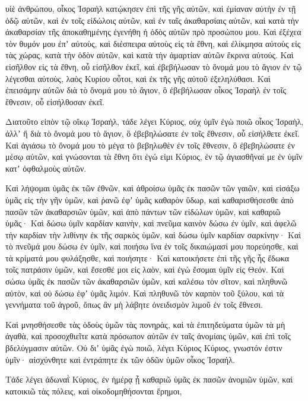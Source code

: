 {υἱὲ ἀνθρώπου, οἶκος Ἰσραὴλ κατῴκησεν ἐπὶ τῆς γῆς αὐτῶν, καὶ ἐμίαναν αὐτὴν ἐν τῇ ὁδῷ αὐτῶν, καὶ ἐν τοῖς εἰδώλοις αὐτῶν, καὶ ἐν ταῖς ἀκαθαρσίαις αὐτῶν, καὶ κατὰ τὴν ἀκαθαρσίαν τῆς ἀποκαθημένης ἐγενήθη ἡ ὁδὸς αὐτῶν πρὸ προσώπου μου.
Καὶ ἐξέχεα τὸν θυμόν μου ἐπʼ αὐτοὺς,
καὶ διέσπειρα αὐτοὺς εἰς τὰ ἔθνη, καὶ ἐλίκμησα αὐτοὺς εἰς τὰς χώρας, κατὰ τὴν ὁδὸν αὐτῶν, καὶ κατὰ τὴν ἁμαρτίαν αὐτῶν ἔκρινα αὐτούς.
Καὶ εἰσῆλθον εἰς τὰ ἔθνη, οὗ εἰσῆλθον ἐκεῖ, καὶ ἐβεβήλωσαν τὸ ὄνομά μου τὸ ἅγιον ἐν τῷ λέγεσθαι αὐτοὺς, λαὸς Κυρίου οὗτοι, καὶ ἐκ τῆς γῆς αὐτοῦ ἐξεληλύθασι.
Καὶ ἐπεισάμην αὐτῶν διὰ τὸ ὄνομά μου τὸ ἅγιον, ὃ ἐβεβήλωσαν οἶκος Ἰσραὴλ ἐν τοῖς ἔθνεσιν, οὗ εἰσήλθοσαν ἐκεῖ.
\par }{\PP {}Διατοῦτο εἰπὸν τῷ οἴκῳ Ἰσραὴλ, τάδε λέγει Κύριος, οὐχ ὑμῖν ἐγὼ ποιῶ οἶκος Ἰσραὴλ, ἀλλʼ ἢ διὰ τὸ ὄνομά μου τὸ ἅγιον, ὃ ἐβεβηλώσατε ἐν τοῖς ἔθνεσιν, οὗ εἰσήλθετε ἐκεῖ.
Καὶ ἁγιάσω τὸ ὄνομά μου τὸ μέγα τὸ βεβηλωθὲν ἐν τοῖς ἔθνεσιν, ὃ ἐβεβηλώσατε ἐν μέσῳ αὐτῶν, καὶ γνώσονται τὰ ἔθνη ὅτι ἐγώ εἰμι Κύριος, ἐν τῷ ἁγιασθῆναί με ἐν ὑμῖν κατʼ ὀφθαλμοὺς αὐτῶν.
\par }{\PP {}Καὶ λήψομαι ὑμᾶς ἐκ τῶν ἐθνῶν, καὶ ἀθροίσω ὑμᾶς ἐκ πασῶν τῶν γαιῶν, καὶ εἰσάξω ὑμᾶς εἰς τὴν γῆν ὑμῶν,
καὶ ῥανῶ ἐφʼ ὑμᾶς καθαρὸν ὕδωρ, καὶ καθαρισθήσεσθε ἀπὸ πασῶν τῶν ἀκαθαρσιῶν ὑμῶν, καὶ ἀπὸ πάντων τῶν εἰδώλων ὑμῶν, καὶ καθαριῶ ὑμᾶς·
Καὶ δώσω ὑμῖν καρδίαν καινὴν, καὶ πνεῦμα καινὸν δώσω ἐν ὑμῖν, καὶ ἀφελῶ τὴν καρδίαν τὴν λιθίνην ἐκ τῆς σαρκὸς ὑμῶν, καὶ δώσω ὑμῖν καρδίαν σαρκίνην·
Καὶ τὸ πνεῦμά μου δώσω ἐν ὑμῖν, καὶ ποιήσω ἵνα ἐν τοῖς δικαιώμασί μου πορεύησθε, καὶ τὰ κρίματά μου φυλάξησθε, καὶ ποιήσητε·
Καὶ κατοικήσετε ἐπὶ τῆς γῆς ἧς ἔδωκα τοῖς πατράσιν ὑμῶν, καὶ ἔσεσθέ μοι εἰς λαὸν, καὶ ἐγὼ ἔσομαι ὑμῖν εἰς Θεόν.
Καὶ σώσω ὑμᾶς ἐκ πασῶν τῶν ἀκαθαρσιῶν ὑμῶν, καὶ καλέσω τὸν σῖτον, καὶ πληθυνῶ αὐτὸν, καὶ οὐ δώσω ἐφʼ ὑμᾶς λιμόν.
Καὶ πληθυνῶ τὸν καρπὸν τοῦ ξύλου, καὶ τὰ γεννήματα τοῦ ἀγροῦ, ὅπως ἂν μὴ λάβητε ὀνειδισμὸν λιμοῦ ἐν τοῖς ἔθνεσι.
\par }{\PP {}Καὶ μνησθήσεσθε τὰς ὁδοὺς ὑμῶν τὰς πονηρὰς, καὶ τὰ ἐπιτηδεύματα ὑμῶν τὰ μὴ ἀγαθὰ, καὶ προσοχθιεῖτε κατὰ πρόσωπον αὐτῶν ἐν ταῖς ἀνομίαις ὑμῶν, καὶ ἐπὶ τοῖς βδελύγμασιν αὐτῶν.
Οὐ διʼ ὑμᾶς ἐγὼ ποιῶ, λέγει Κύριος Κύριος, γνωστόν ἐστιν ὑμῖν· αἰσχύνθητε καὶ ἐντράπητε ἐκ τῶν ὁδῶν ὑμῶν οἶκος Ἰσραήλ.
\par }{\PP {}Τάδε λέγει ἀδωναῒ Κύριος, ἐν ἡμέρᾳ ᾗ καθαριῶ ὑμᾶς ἐκ πασῶν ἀνομιῶν ὑμῶν, καὶ κατοικιῶ τὰς πόλεις, καὶ οἰκοδομηθήσονται ἔρημοι,
}
